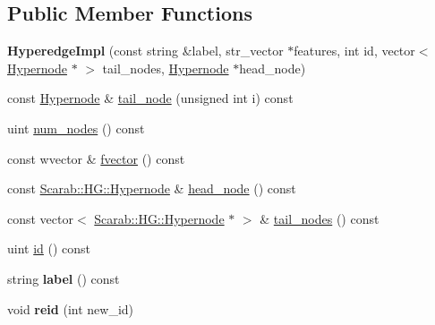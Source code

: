 \subsection*{Public Member Functions}
\begin{DoxyCompactItemize}
\item 
\hypertarget{classScarab_1_1HG_1_1HyperedgeImpl_a3c141efe1be2e8ee78d45caca4711c6e}{
{\bfseries HyperedgeImpl} (const string \&label, str\_\-vector $\ast$features, int id, vector$<$ \hyperlink{classScarab_1_1HG_1_1Hypernode}{Hypernode} $\ast$ $>$ tail\_\-nodes, \hyperlink{classScarab_1_1HG_1_1Hypernode}{Hypernode} $\ast$head\_\-node)}
\label{classScarab_1_1HG_1_1HyperedgeImpl_a3c141efe1be2e8ee78d45caca4711c6e}

\item 
const \hyperlink{classScarab_1_1HG_1_1Hypernode}{Hypernode} \& \hyperlink{classScarab_1_1HG_1_1HyperedgeImpl_a7087ba121f3056eb5946d1909c4b3d58}{tail\_\-node} (unsigned int i) const 
\item 
uint \hyperlink{classScarab_1_1HG_1_1HyperedgeImpl_a9a5bef8789c9c7caee6f53833ea4acc7}{num\_\-nodes} () const 
\item 
const wvector \& \hyperlink{classScarab_1_1HG_1_1HyperedgeImpl_a359446c285164a93995bb87e6ea74882}{fvector} () const 
\item 
const \hyperlink{classScarab_1_1HG_1_1Hypernode}{Scarab::HG::Hypernode} \& \hyperlink{classScarab_1_1HG_1_1HyperedgeImpl_ae194bfc8ecac2a12791fa36c1c2c62a7}{head\_\-node} () const 
\item 
const vector$<$ \hyperlink{classScarab_1_1HG_1_1Hypernode}{Scarab::HG::Hypernode} $\ast$ $>$ \& \hyperlink{classScarab_1_1HG_1_1HyperedgeImpl_a3bf00c8c032397150f59e196aea5e245}{tail\_\-nodes} () const 
\item 
uint \hyperlink{classScarab_1_1HG_1_1HyperedgeImpl_afa81943347267781c25c4e68f7f5f547}{id} () const 
\item 
\hypertarget{classScarab_1_1HG_1_1HyperedgeImpl_a8fe687c9914de37c4d91c353ba669665}{
string {\bfseries label} () const }
\label{classScarab_1_1HG_1_1HyperedgeImpl_a8fe687c9914de37c4d91c353ba669665}

\item 
\hypertarget{classScarab_1_1HG_1_1HyperedgeImpl_a068e4291cbcaa68a59ad64ede34f9edc}{
void {\bfseries reid} (int new\_\-id)}
\label{classScarab_1_1HG_1_1HyperedgeImpl_a068e4291cbcaa68a59ad64ede34f9edc}

\end{DoxyCompactItemize}
